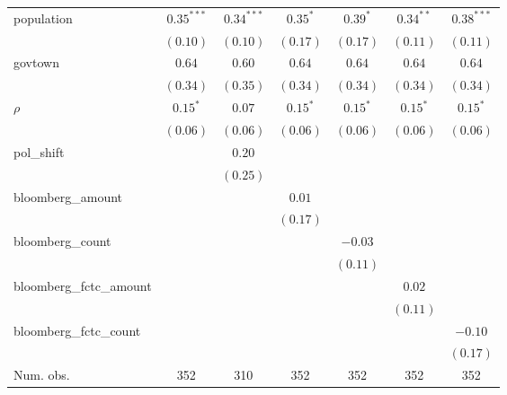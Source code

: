 \begin{table}[!h]
\begin{center}
\begin{tabular}{l c c c c c c }
population              & $0.35^{***}$ & $0.34^{***}$  & $0.35^{*}$   & $0.39^{*}$   & $0.34^{**}$  & $0.38^{***}$ \\
                        & $(0.10)$     & $(0.10)$      & $(0.17)$     & $(0.17)$     & $(0.11)$     & $(0.11)$     \\
govtown                 & $0.64$       & $0.60$        & $0.64$       & $0.64$       & $0.64$       & $0.64$       \\
                        & $(0.34)$     & $(0.35)$      & $(0.34)$     & $(0.34)$     & $(0.34)$     & $(0.34)$     \\
$\rho$                  & $0.15^{*}$   & $0.07$        & $0.15^{*}$   & $0.15^{*}$   & $0.15^{*}$   & $0.15^{*}$   \\
                        & $(0.06)$     & $(0.06)$      & $(0.06)$     & $(0.06)$     & $(0.06)$     & $(0.06)$     \\
pol\_shift              &              & $0.20$        &              &              &              &              \\
                        &              & $(0.25)$      &              &              &              &              \\
bloomberg\_amount       &              &               & $0.01$       &              &              &              \\
                        &              &               & $(0.17)$     &              &              &              \\
bloomberg\_count        &              &               &              & $-0.03$      &              &              \\
                        &              &               &              & $(0.11)$     &              &              \\
bloomberg\_fctc\_amount &              &               &              &              & $0.02$       &              \\
                        &              &               &              &              & $(0.11)$     &              \\
bloomberg\_fctc\_count  &              &               &              &              &              & $-0.10$      \\
                        &              &               &              &              &              & $(0.17)$     \\
\midrule
Num. obs.               & 352          & 310           & 352          & 352          & 352          & 352          \\

\end{tabular}
\end{center}
\end{table}
